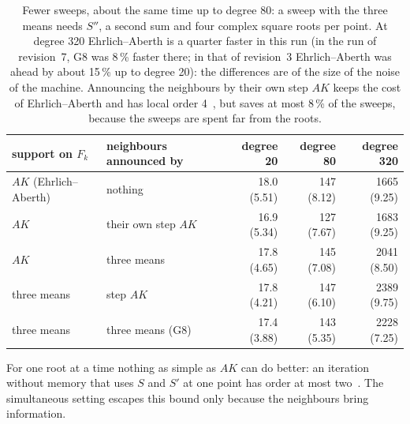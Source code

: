 \documentclass[10pt,a4paper]{article}
\theoremstyle{definition}
\numberwithin{equation}{section}
\begin{document}
\begin{table}[H]\centering\small
\begin{tabular}{llrrr}
\toprule
support on $F_k$ & neighbours announced by & degree 20 & degree 80 & degree 320\\
\midrule
$AK$ (Ehrlich--Aberth) & nothing & 18.0 (5.51) & 147 (8.12) & 1665 (9.25)\\
$AK$ & their own step $AK$ & 16.9 (5.34) & 127 (7.67) & 1683 (9.25)\\
$AK$ & three means & 17.8 (4.65) & 145 (7.08) & 2041 (8.50)\\
three means & step $AK$ & 17.8 (4.21) & 147 (6.10) & 2389 (9.75)\\
three means & three means (G8) & 17.4 (3.88) & 143 (5.35) & 2228 (7.25)\\
\bottomrule
\end{tabular}
\caption{Fewer sweeps, about the same time up to degree 80: a sweep with the three means needs $S''$, a
second sum and four complex square roots per point. At degree 320 Ehrlich--Aberth is a quarter faster
in this run (in the run of revision~7, G8 was 8\,\% faster there; in that of revision~3 Ehrlich--Aberth
was ahead by about 15\,\% up to degree 20): the differences are of the size of the noise of the
machine. Announcing the neighbours by their own step $AK$ keeps the cost of Ehrlich--Aberth and has
local order 4~\cite{nourein}, but saves at most 8\,\% of the sweeps, because the sweeps are spent far
from the roots.}
\end{table}
For one root at a time nothing as simple as $AK$ can do better: an iteration without memory that
uses $S$ and $S'$ at one point has order at most two~\cite{traub}. The simultaneous setting escapes
this bound only because the neighbours bring information.
\end{document}
